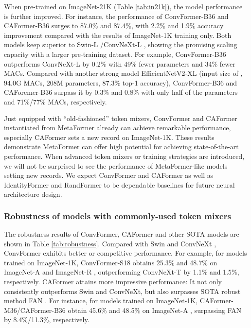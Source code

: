 When pre-trained on ImageNet-21K (Table \ref{tab:in21k}), the model performance is further improved. For instance, the performance of ConvFormer-B36 and CAFormer-B36 surges to 87.0\% and 87.4\%, with 2.2\% and 1.9\% accuracy improvement compared with the results of ImageNet-1K training only. Both models keep superior to Swin-L \cite{swin}/ConvNeXt-L \cite{convnext}, showing the promising scaling capacity with a larger pre-training dataset. For example, ConvFormer-B36 outperforms ConvNeXt-L by 0.2\% with 49\% fewer parameters and 34\% fewer MACs. Compared with another strong model EfficientNetV2-XL (input size of , 94.0G MACs, 208M parameters, 87.3\% top-1 accuracy), ConvFormer-B36 and CAForemer-B36 surpass it by 0.3\% and 0.8\% with only half of the parameters and 71\%/77\% MACs, respectively. 


Just equipped with ``old-fashioned'' token mixers, ConvFormer and CAFormer instantiated from MetaFormer already can achieve remarkable performance, especially CAFormer sets a new record on ImageNet-1K. These results demonstrate MetaFormer can offer high potential for achieving state-of-the-art performance. When advanced token mixers or training strategies are introduced, we will not be surprised to see the performance of MetaFormer-like models setting new records. We expect ConvFormer and CAFormer as well as IdentityFormer and RandFormer to be dependable baselines for future neural architecture design. 


\subsubsection{Robustness of models with commonly-used token mixers}

The robustness results of ConvFormer, CAFormer and other SOTA models are shown in Table \ref{tab:robustness}. Compared with Swin \cite{swin} and ConvNeXt \cite{convnext}, ConvFormer exhibits better or competitive performance. For example, for models trained on ImageNet-1K, ConvFormer-S18 obtains 25.3\% and 48.7\% on ImageNet-A \cite{imagenet-a} and ImageNet-R \cite{imagenet-r}, outperforming ConvNeXt-T by 1.1\% and 1.5\%, respectively. CAFormer attains more impressive performance: It not only consistently outperforms Swin and ConvNeXt, but also surpasses SOTA robust method FAN \cite{zhou2022understanding}. For instance, for models trained on ImageNet-1K, CAFormer-M36/CAFormer-B36 obtain 45.6\% and 48.5\% on ImageNet-A \cite{imagenet-a}, surpassing FAN \cite{zhou2022understanding} by 8.4\%/11.3\%, respectively.  




